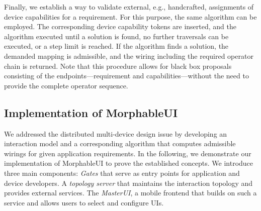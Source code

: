 \documentclass[twoside,twocolumn,10pt]{article}
\begin{document}
%
%
Finally, we establish a way to validate external, e.g., handcrafted, assignments of device capabilities for a requirement. For this purpose, the same algorithm can be employed. The corresponding device capability tokens are inserted, and the algorithm executed until a solution is found, no further traversals can be executed, or a step limit is reached. If the algorithm finds a solution, the demanded mapping is admissible, and the wiring including the required operator chain is returned. Note that this procedure allows for black box proposals consisting of the endpoints---requirement and capabilities---without the need to provide the complete operator sequence.



%




%
%
\subsection{Implementation of MorphableUI} \label{gates}


%
%
We addressed the distributed multi-device design issue by developing an interaction model and a corresponding algorithm that computes admissible wirings for given application requirements.
In the following, we demonstrate our implementation of MorphableUI to prove the established concepts. We introduce three main components: \emph{Gates} that serve as entry points for application and device developers. A \emph{topology server} that maintains the interaction topology and provides external services. The \emph{MasterUI}, a mobile frontend that builds on such a service and allows users to select and configure UIs.

\end{document}
